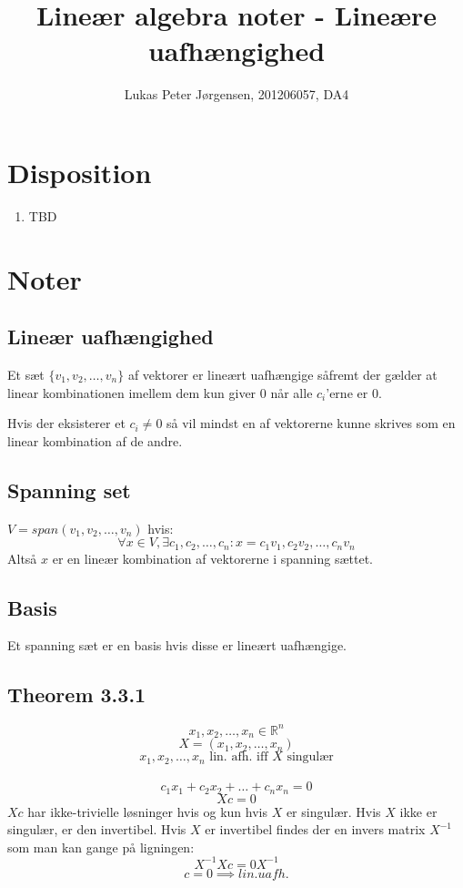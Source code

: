 \documentclass[a4paper,oneside,article]{memoir}
\begin{document}
    \title{Lineær algebra noter - Lineære uafhængighed}
    \author{Lukas Peter Jørgensen, 201206057, DA4
            }
    \maketitle
        	
    \tableofcontents
        
    \chapter{Disposition}
    \begin{enumerate}
    	\item TBD
    \end{enumerate}
    
	\chapter{Noter}
	
	\section{Lineær uafhængighed}
	Et sæt $\{v_1,v_2,\dots,v_n\}$ af vektorer er lineært uafhængige såfremt der gælder at linear kombinationen imellem dem kun giver $0$ når alle $c_i$'erne er $0$.
	
	Hvis der eksisterer et $c_i\neq 0$ så vil mindst en af vektorerne kunne skrives som en linear kombination af de andre.
	 
	\section{Spanning set}
	$V=span(v_1,v_2,\dots, v_n)$ hvis: $$\forall x \in V, \exists c_1, c_2, \dots, c_n: x=c_1v_1,c_2v_2,\dots,c_nv_n$$
	Altså $x$ er en lineær kombination af vektorerne i spanning sættet.
	
	\section{Basis}
	Et spanning sæt er en basis hvis disse er lineært uafhængige.
	    
	 \section{Theorem 3.3.1}
	 $$x_1,x_2,\dots,x_n \in \mathbb{R}^n$$
	 $$X=(x_1,x_2,\dots,x_n)$$
	 $$x_1,x_2,\dots,x_n \text{ lin. afh. iff } X \text{ singulær}$$
	 \\
	 $$c_1x_1+c_2x_2+\dots+c_nx_n=0$$
	 $$Xc=0$$
	 $Xc$ har ikke-trivielle løsninger hvis og kun hvis 
	 $X$ er singulær. Hvis $X$ ikke er singulær, er den
	 invertibel. Hvis $X$ er invertibel findes der en 
	 invers matrix $X^{-1}$ som man kan gange på ligningen:
	 $$X^{-1}Xc=0X^{-1}$$
	 $$c=0\implies lin. uafh.$$
	 
\end{document}
